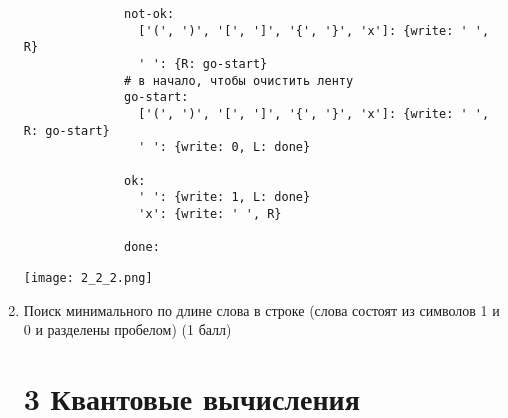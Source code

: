 \documentclass{article}
\begin{document}
\begin{enumerate}
\begin{verbatim}
              not-ok:
                ['(', ')', '[', ']', '{', '}', 'x']: {write: ' ', R}
                ' ': {R: go-start}
              # в начало, чтобы очистить ленту
              go-start:
                ['(', ')', '[', ']', '{', '}', 'x']: {write: ' ', R: go-start}
                ' ': {write: 0, L: done}
                
              ok:
                ' ': {write: 1, L: done}
                'x': {write: ' ', R}
            
              done:

        \end{verbatim}
        \begin{center}
            \texttt{[image: 2\_2\_2.png]} \\
        \end{center}

    \item Поиск минимального по длине слова в строке (слова состоят из символов 1 и 0 и разделены пробелом) (1 балл)

\section*{3 Квантовые вычисления}

\end{enumerate}
\end{document}
